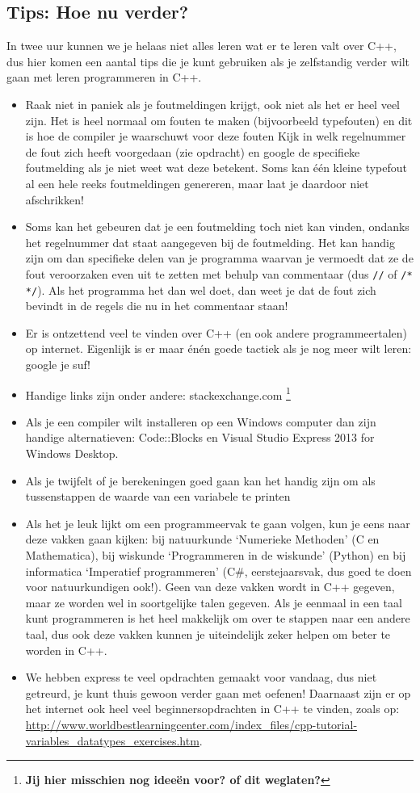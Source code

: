 \documentclass[12pt,a4paper]{article}
\newcommand{\icode}{\lstinline}
\begin{document}
\subsection{Tips: Hoe nu verder?}
In twee uur kunnen we je helaas niet alles leren wat er te leren valt over C++, dus hier komen een aantal tips die je kunt gebruiken als je zelfstandig verder wilt gaan met leren programmeren in C++. 
\begin{itemize}
	\item Raak niet in paniek als je foutmeldingen krijgt, ook niet als het er heel veel zijn. Het is heel normaal om fouten te maken (bijvoorbeeld typefouten) en dit is hoe de compiler je waarschuwt voor deze fouten Kijk in welk regelnummer de fout zich heeft voorgedaan (zie opdracht) en google de specifieke foutmelding als je niet weet wat deze betekent. Soms kan \'e\'en kleine typefout al een hele reeks foutmeldingen genereren, maar laat je daardoor niet afschrikken! 
	\item Soms kan het gebeuren dat je een foutmelding toch niet kan vinden, ondanks het regelnummer dat staat aangegeven bij de foutmelding. Het kan handig zijn om dan specifieke delen van je programma waarvan je vermoedt dat ze de fout veroorzaken even uit te zetten met behulp van commentaar (dus \icode{//} of \icode{/* */}). Als het programma het dan wel doet, dan weet je dat de fout zich bevindt in de regels die nu in het commentaar staan! 
	\item Er is ontzettend veel te vinden over C++ (en ook andere programmeertalen) op internet. Eigenlijk is er maar \'en\'en goede tactiek als je nog meer wilt leren: google je suf! 
	\item Handige links zijn onder andere: stackexchange.com \footnote{\textbf{Jij hier misschien nog ideeën voor? of dit weglaten?}}
	\item Als je een compiler wilt installeren op een Windows computer dan zijn handige alternatieven: Code::Blocks en Visual Studio Express 2013 for Windows Desktop. 
	\item Als je twijfelt of je berekeningen goed gaan kan het handig zijn om als tussenstappen de waarde van een variabele te printen 
	\item Als het je leuk lijkt om een programmeervak te gaan volgen, kun je eens naar deze vakken gaan kijken: bij natuurkunde `Numerieke Methoden' (C en Mathematica), bij wiskunde `Programmeren in de wiskunde' (Python) en bij informatica `Imperatief programmeren' (C\#, eerstejaarsvak, dus goed te doen voor natuurkundigen ook!). Geen van deze vakken wordt in C++ gegeven, maar ze worden wel in soortgelijke talen gegeven. Als je eenmaal in een taal kunt programmeren is het heel makkelijk om over te stappen naar een andere taal, dus ook deze vakken kunnen je uiteindelijk zeker helpen om beter te worden in C++. 
	\item We hebben express te veel opdrachten gemaakt voor vandaag, dus niet getreurd, je kunt thuis gewoon verder gaan met oefenen! Daarnaast zijn er op het internet ook heel veel beginnersopdrachten in C++ te vinden, zoals op: \url{http://www.worldbestlearningcenter.com/index_files/cpp-tutorial-variables_datatypes_exercises.htm}.
\end{itemize}
\end{document}
